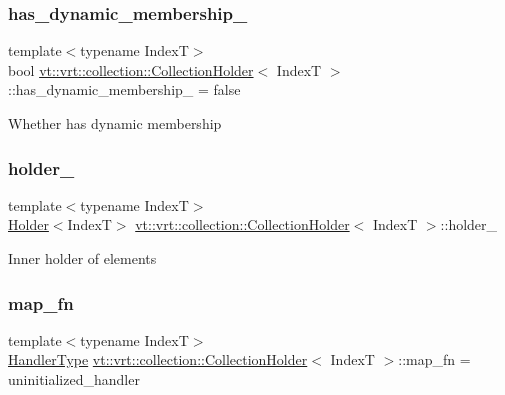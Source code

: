 \subsubsection{\texorpdfstring{has\+\_\+dynamic\+\_\+membership\+\_\+}{has\_dynamic\_membership\_}}
{\footnotesize\ttfamily template$<$typename IndexT$>$ \\
bool \hyperlink{structvt_1_1vrt_1_1collection_1_1_collection_holder}{vt\+::vrt\+::collection\+::\+Collection\+Holder}$<$ IndexT $>$\+::has\+\_\+dynamic\+\_\+membership\+\_\+ = false}

Whether has dynamic membership \mbox{\label{structvt_1_1vrt_1_1collection_1_1_collection_holder_a9b59adb37c13335d7cc3c99b4fb1b725}} 
\subsubsection{\texorpdfstring{holder\+\_\+}{holder\_}}
{\footnotesize\ttfamily template$<$typename IndexT$>$ \\
\hyperlink{structvt_1_1vrt_1_1collection_1_1_holder}{Holder}$<$IndexT$>$ \hyperlink{structvt_1_1vrt_1_1collection_1_1_collection_holder}{vt\+::vrt\+::collection\+::\+Collection\+Holder}$<$ IndexT $>$\+::holder\+\_\+}

Inner holder of elements \mbox{\label{structvt_1_1vrt_1_1collection_1_1_collection_holder_a6e82cbf6cf04497082fb47e79e5dd936}} 
\subsubsection{\texorpdfstring{map\+\_\+fn}{map\_fn}}
{\footnotesize\ttfamily template$<$typename IndexT$>$ \\
\hyperlink{namespacevt_af64846b57dfcaf104da3ef6967917573}{Handler\+Type} \hyperlink{structvt_1_1vrt_1_1collection_1_1_collection_holder}{vt\+::vrt\+::collection\+::\+Collection\+Holder}$<$ IndexT $>$\+::map\+\_\+fn = uninitialized\+\_\+handler}


